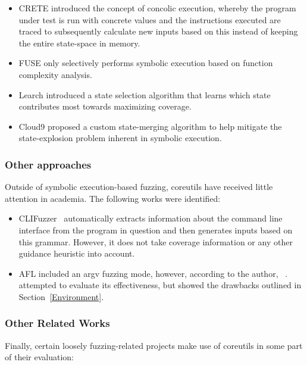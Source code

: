 \documentclass{article}
\let\savedCite=\cite
\renewcommand{\cite}{\unskip~\savedCite}
\begin{document}
\begin{multicols}{2}
    \begin{itemize}
        \item CRETE introduced the concept of concolic execution, whereby the program under test is run with concrete values and the instructions executed are traced to subsequently calculate new inputs based on this instead of keeping the entire state-space in memory.\cite{CRETE}
        \item FUSE only selectively performs symbolic execution based on function complexity analysis.\cite{FUSE}
        \item Learch introduced a state selection algorithm that learns which state contributes most towards maximizing coverage.\cite{Learch}
        \item Cloud9 proposed a custom state-merging algorithm to help mitigate the state-explosion problem inherent in symbolic execution.\cite{Cloud9}
    \end{itemize}

    \subsubsection{Other approaches}

    Outside of symbolic execution-based fuzzing, coreutils have received little attention in academia. The following works were identified:

    \begin{itemize}
        \item CLIFuzzer\cite{CLIFuzzer} automatically extracts information about the command line interface from the program in question and then generates inputs based on this grammar. However, it does not take coverage information or any other guidance heuristic into account.
        \item AFL included an argv fuzzing mode, however, according to the author, \cite{AFLPlusPlusargv}. \citeauthor{AFLCoreutils} attempted to evaluate its effectiveness, but showed the drawbacks outlined in Section~\ref{Environment}.\cite{AFLCoreutils}
    \end{itemize}

    \subsubsection{Other Related Works}

    Finally, certain loosely fuzzing-related projects make use of coreutils in some part of their evaluation:


\end{multicols}
\end{document}
